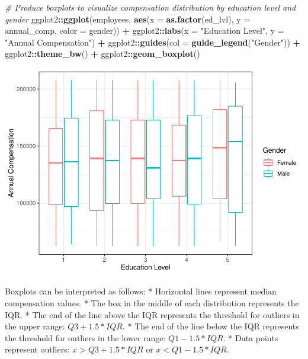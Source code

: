 \documentclass[]{book}
\newenvironment{Shaded}{\begin{snugshade}}{\end{snugshade}}
\newcommand{\CommentTok}[1]{\textcolor[rgb]{0.56,0.35,0.01}{\textit{#1}}}
\newcommand{\DataTypeTok}[1]{\textcolor[rgb]{0.13,0.29,0.53}{#1}}
\newcommand{\KeywordTok}[1]{\textcolor[rgb]{0.13,0.29,0.53}{\textbf{#1}}}
\newcommand{\NormalTok}[1]{#1}
\newcommand{\OperatorTok}[1]{\textcolor[rgb]{0.81,0.36,0.00}{\textbf{#1}}}
\newcommand{\StringTok}[1]{\textcolor[rgb]{0.31,0.60,0.02}{#1}}
\begin{document}
\begin{Shaded}
\begin{Highlighting}[]
\CommentTok{# Produce boxplots to visualize compensation distribution by education level and gender}
\NormalTok{ggplot2}\OperatorTok{::}\KeywordTok{ggplot}\NormalTok{(employees, }\KeywordTok{aes}\NormalTok{(}\DataTypeTok{x =} \KeywordTok{as.factor}\NormalTok{(ed_lvl), }\DataTypeTok{y =}\NormalTok{ annual_comp, }\DataTypeTok{color =}\NormalTok{ gender)) }\OperatorTok{+}
\NormalTok{ggplot2}\OperatorTok{::}\KeywordTok{labs}\NormalTok{(}\DataTypeTok{x =} \StringTok{"Education Level"}\NormalTok{, }\DataTypeTok{y =} \StringTok{"Annual Compensation"}\NormalTok{) }\OperatorTok{+}\StringTok{ }
\NormalTok{ggplot2}\OperatorTok{::}\KeywordTok{guides}\NormalTok{(}\DataTypeTok{col =} \KeywordTok{guide_legend}\NormalTok{(}\StringTok{"Gender"}\NormalTok{)) }\OperatorTok{+}
\NormalTok{ggplot2}\OperatorTok{::}\KeywordTok{theme_bw}\NormalTok{() }\OperatorTok{+}
\NormalTok{ggplot2}\OperatorTok{::}\KeywordTok{geom_boxplot}\NormalTok{()}
\end{Highlighting}
\end{Shaded}

\includegraphics{People_Analytics_Lifecycle_files/figure-latex/unnamed-chunk-68-1.pdf}

Boxplots can be interpreted as follows:
* Horizontal lines represent median compensation values.
* The box in the middle of each distribution represents the IQR.
* The end of the line above the IQR represents the threshold for outliers in the upper range: \(Q3 + 1.5 * IQR\).
* The end of the line below the IQR represents the threshold for outliers in the lower range: \(Q1 - 1.5 * IQR\).
* Data points represent outliers: \(x > Q3 + 1.5 * IQR\) or \(x < Q1 - 1.5 * IQR\).
\end{document}
